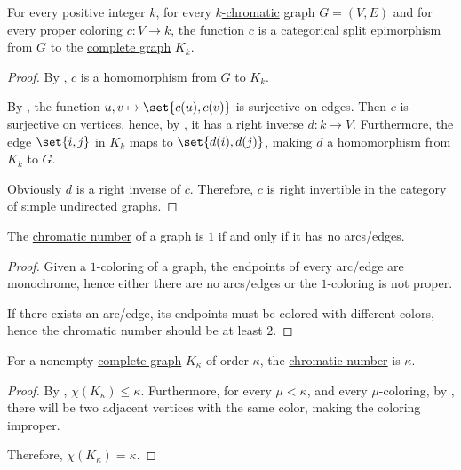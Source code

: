 \begin{corollary}\label{thm:chromatic_number_coloring_splits}
  For every positive integer \( k \), for every \hyperref[def:chromatic_number]{\( k \)-chromatic} graph \( G = (V, E) \) and for every proper coloring \( c: V \to k \), the function \( c \) is a \hyperref[def:morphism_invertibility/right_cancellative]{categorical split epimorphism} from \( G \) to the \hyperref[def:complete_graph]{complete graph} \( K_k \).
\end{corollary}
\begin{proof}
  By , \( c \) is a homomorphism from \( G \) to \( K_k \).

  By , the function \( { u, v } \mapsto \set{ c(u), c(v) } \) is surjective on edges. Then \( c \) is surjective on vertices, hence, by , it has a right inverse \( d: k \to V \). Furthermore, the edge \( \set{ i, j } \) in \( K_k \) maps to \( \set{ d(i), d(j) } \), making \( d \) a homomorphism from \( K_k \) to \( G \).

  Obviously \( d \) is a right inverse of \( c \). Therefore, \( c \) is right invertible in the category of simple undirected graphs.
\end{proof}

\begin{proposition}\label{thm:chromatic_number_edgeless}
  The \hyperref[def:chromatic_number]{chromatic number} of a graph is \( 1 \) if and only if it has no arcs/edges.
\end{proposition}
\begin{proof}
  \SufficiencySubProof Given a \( 1 \)-coloring of a graph, the endpoints of every arc/edge are monochrome, hence either there are no arcs/edges or the \( 1 \)-coloring is not proper.

  \NecessitySubProof If there exists an arc/edge, its endpoints must be colored with different colors, hence the chromatic number should be at least \( 2 \).
\end{proof}

\begin{proposition}\label{thm:complete_graph_chromatic_number}
  For a nonempty \hyperref[def:complete_graph]{complete graph} \( K_\kappa \) of order \( \kappa \), the \hyperref[def:graph_chromatic_number]{chromatic number} is \( \kappa \).
\end{proposition}
\begin{proof}
  By , \( \chi(K_\kappa) \leq \kappa \). Furthermore, for every \( \mu < \kappa \), and every \( \mu \)-coloring, by , there will be two adjacent vertices with the same color, making the coloring improper.

  Therefore, \( \chi(K_\kappa) = \kappa \).
\end{proof}

